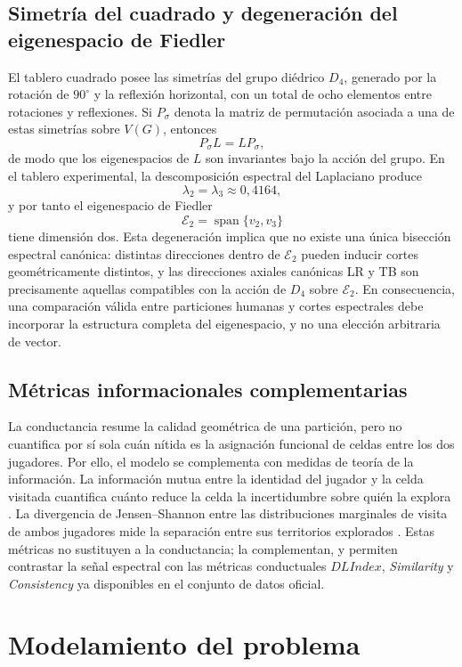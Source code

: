 \documentclass[journal]{IEEEtran}
\newcommand{\Etwo}{\mathcal{E}_2}
\begin{document}
\subsection{Simetría del cuadrado y degeneración del eigenespacio de Fiedler}

El tablero cuadrado posee las simetrías del grupo diédrico $D_4$, generado por la rotación de $90^\circ$ y la reflexión horizontal, con un total de ocho elementos entre rotaciones y reflexiones. Si $P_\sigma$ denota la matriz de permutación asociada a una de estas simetrías sobre $V(G)$, entonces
\[
P_\sigma L = L P_\sigma,
\]
de modo que los eigenespacios de $L$ son invariantes bajo la acción del grupo. En el tablero experimental, la descomposición espectral del Laplaciano produce
\[
\lambda_2 = \lambda_3 \approx 0{,}4164,
\]
y por tanto el eigenespacio de Fiedler
\[
\Etwo = \operatorname{span}\{v_2, v_3\}
\]
tiene dimensión dos. Esta degeneración implica que no existe una única bisección espectral canónica: distintas direcciones dentro de $\Etwo$ pueden inducir cortes geométricamente distintos, y las direcciones axiales canónicas LR y TB son precisamente aquellas compatibles con la acción de $D_4$ sobre $\Etwo$. En consecuencia, una comparación válida entre particiones humanas y cortes espectrales debe incorporar la estructura completa del eigenespacio, y no una elección arbitraria de vector.

\subsection{Métricas informacionales complementarias}

La conductancia resume la calidad geométrica de una partición, pero no cuantifica por sí sola cuán nítida es la asignación funcional de celdas entre los dos jugadores. Por ello, el modelo se complementa con medidas de teoría de la información. La información mutua entre la identidad del jugador y la celda visitada cuantifica cuánto reduce la celda la incertidumbre sobre quién la explora \cite{cover2006}. La divergencia de Jensen--Shannon entre las distribuciones marginales de visita de ambos jugadores mide la separación entre sus territorios explorados \cite{lin1991}. Estas métricas no sustituyen a la conductancia; la complementan, y permiten contrastar la señal espectral con las métricas conductuales $DLIndex$, \emph{Similarity} y \emph{Consistency} ya disponibles en el conjunto de datos oficial.

\section{Modelamiento del problema}\label{sec:modelamiento}
\end{document}
